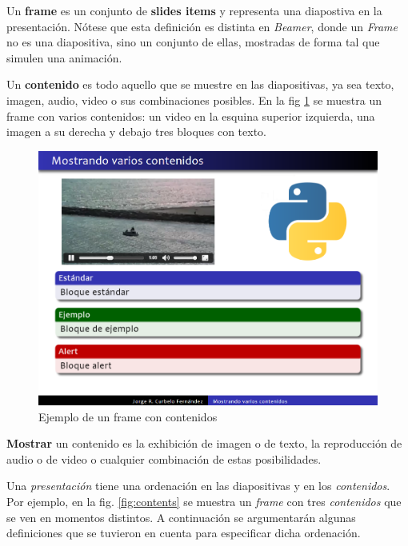  		\begin{definition}
 		\label{def:frame}
			Un \textbf{frame} es un conjunto de \textbf{slides items} y representa una diapostiva en la presentación. Nótese que esta definición es distinta en \textit{Beamer}, donde un \textit{Frame} no es una diapositiva, sino un conjunto de ellas, mostradas de forma tal que simulen una animación.
 		\end{definition}		

		\begin{definition}
		\label{def:content}
			Un \textbf{contenido} es todo aquello que se muestre en las diapositivas, ya sea texto, imagen, audio, video o sus combinaciones posibles. En la fig \ref{fig:frame_video_image} se muestra un frame con varios contenidos: un video en la esquina superior izquierda, una imagen a su derecha y debajo tres bloques con texto.
		\end{definition}
 		\begin{figure}[tb]
 			\centering
 			\includegraphics[width=12cm]{img/frame-video-image}
 			\caption{Ejemplo de un frame con contenidos}
 			\label{fig:frame_video_image}
 		\end{figure} 		

		\begin{definition}
		\label{def:show}
			\textbf{Mostrar} un contenido es la exhibición de imagen o de texto, la reproducción de audio o de video o cualquier combinación de estas posibilidades.
		\end{definition} 		

		Una \textit{presentación} tiene una ordenación en las diapositivas y en los \textit{contenidos}. Por ejemplo, en la fig. \ref{fig:contents} se muestra un \textit{frame} con tres \textit{contenidos} que se ven en momentos distintos. A continuación se argumentarán algunas definiciones que se tuvieron en cuenta para especificar dicha ordenación.

